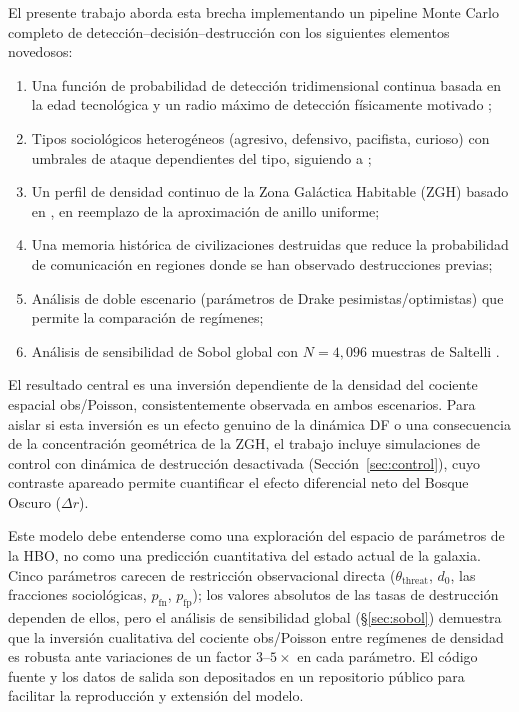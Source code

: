 \documentclass[11pt,a4paper,onecolumn]{article}
\begin{document}
El presente trabajo aborda esta brecha implementando un pipeline
Monte Carlo completo de detección--decisión--destrucción con los
siguientes elementos novedosos:
\begin{enumerate}
  \item Una función de probabilidad de detección tridimensional
        continua basada en la edad tecnológica y un radio máximo de
        detección físicamente motivado
        \citep[$r_\text{max} = 1000$\,al,][]{troitskij1989,loeb2007};
  \item Tipos sociológicos heterogéneos (agresivo, defensivo, pacifista,
        curioso) con umbrales de ataque dependientes del tipo, siguiendo
        a \citet{devladar2013};
  \item Un perfil de densidad continuo de la Zona Galáctica Habitable
        (ZGH) basado en \citet{lineweaver2004}, en reemplazo de la
        aproximación de anillo uniforme;
  \item Una memoria histórica de civilizaciones destruidas que reduce la
        probabilidad de comunicación en regiones donde se han observado
        destrucciones previas;
  \item Análisis de doble escenario (parámetros de Drake
        pesimistas/optimistas) que permite la comparación de regímenes;
  \item Análisis de sensibilidad de Sobol global con $N = 4{,}096$
        muestras de Saltelli \citep{saltelli2010}.
\end{enumerate}

El resultado central es una inversión dependiente de la densidad del
cociente espacial obs/Poisson, consistentemente observada en ambos
escenarios.
Para aislar si esta inversión es un efecto genuino de la dinámica DF
o una consecuencia de la concentración geométrica de la ZGH, el trabajo
incluye simulaciones de control con dinámica de destrucción desactivada
(Sección~\ref{sec:control}), cuyo contraste apareado permite cuantificar
el efecto diferencial neto del Bosque Oscuro ($\Delta r$).

Este modelo debe entenderse como una exploración del espacio de
parámetros de la HBO, no como una predicción cuantitativa del estado
actual de la galaxia.
Cinco parámetros carecen de restricción observacional directa
($\theta_\text{threat}$, $d_0$, las fracciones sociológicas,
$p_\text{fn}$, $p_\text{fp}$); los valores absolutos de las tasas de
destrucción dependen de ellos, pero el análisis de sensibilidad global
(\S\ref{sec:sobol}) demuestra que la inversión cualitativa del cociente
obs/Poisson entre regímenes de densidad es robusta ante variaciones
de un factor $3$--$5\times$ en cada parámetro.
El código fuente y los datos de salida son depositados en un repositorio
público para facilitar la reproducción y extensión del modelo.
\end{document}
